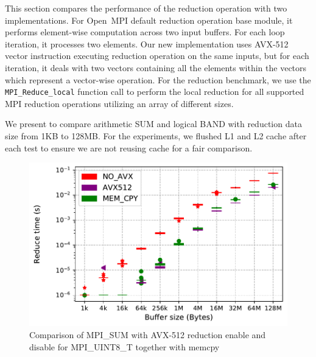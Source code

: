 \documentclass[5p,times,twocolumn]{elsarticle}
\newcommand{\mpifunc}[1]{\lstinline"MPI_#1"\xspace}
\newcommand{\ompi}[0]{Open~MPI\xspace}
\begin{document}
This section compares the performance of the reduction operation with two
implementations.
For \ompi default reduction operation base module, it
performs element-wise computation across two input buffers. For each loop iteration,
it processes two elements. Our new implementation uses AVX-512 vector instruction
executing reduction operation on the same inputs, but for each iteration, it
deals with two vectors containing all the elements within the vectors which represent
a vector-wise operation.
For the reduction benchmark, we use the \mpifunc{Reduce_local} function call to
perform the local reduction for all supported MPI reduction operations utilizing an array of different sizes.

We present to compare arithmetic SUM and logical BAND with reduction data size from 1KB to 128MB.
For the experiments, we flushed L1 and L2 cache after each test to ensure we are not reusing cache for a fair comparison.

\begin{figure}[h]
    \centering
    \includegraphics[width=\linewidth]{avx_extend_more_sum_u8_1k-128M.pdf}
    \caption{Comparison of MPI\_SUM with AVX-512 reduction enable and disable for MPI\_UINT8\_T together with memcpy}
    \label{fig:avxsum}
\end{figure}
\end{document}
